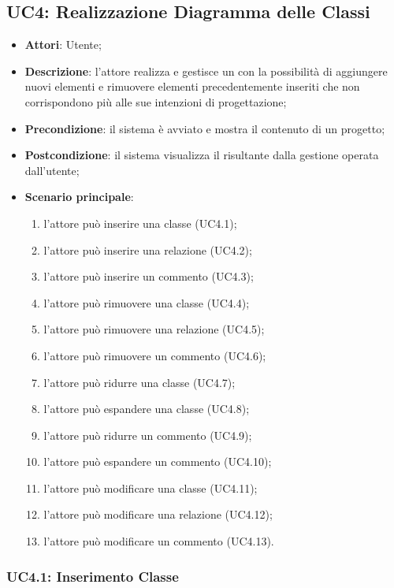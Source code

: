 \subsection{UC4: Realizzazione Diagramma delle Classi}
\label{UC4}

\begin{itemize}
\item \textbf{Attori}: Utente;
\item \textbf{Descrizione}: l'attore realizza e gestisce un  con la possibilità di aggiungere nuovi elementi e rimuovere elementi precedentemente inseriti che non corrispondono più alle sue intenzioni di progettazione;
\item \textbf{Precondizione}: il sistema è avviato e mostra il contenuto di un progetto;
\item \textbf{Postcondizione}: il sistema visualizza il  risultante dalla gestione operata dall'utente;
\item \textbf{Scenario principale}:
	\begin{enumerate}
	 \item l'attore può inserire una classe (UC4.1);
	 \item l'attore può inserire una relazione (UC4.2);
	 \item l'attore può inserire un commento (UC4.3);
	 \item l'attore può rimuovere una classe (UC4.4);
	 \item l'attore può rimuovere una relazione (UC4.5);
	 \item l'attore può rimuovere un commento (UC4.6);
	 \item l'attore può ridurre una classe (UC4.7);
	 \item l'attore può espandere una classe (UC4.8);
	 \item l'attore può ridurre un commento (UC4.9);
	 \item l'attore può espandere un commento (UC4.10);
	  \item l'attore può modificare una classe (UC4.11);
	 \item l'attore può modificare una relazione (UC4.12);
	 \item l'attore può modificare un commento (UC4.13).
	\end{enumerate}
\end{itemize}

\subsubsection{UC4.1: Inserimento Classe}
\label{UC4.1}

